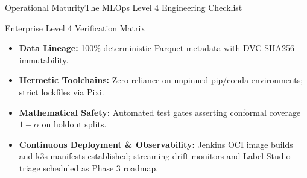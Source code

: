 \begin{frame}{Operational Maturity}{The MLOps Level 4 Engineering Checklist}
    \begin{block}{Enterprise Level 4 Verification Matrix}
        \begin{itemize}\small
            \item \textbf{Data Lineage:} 100\% deterministic Parquet metadata with DVC SHA256 immutability.
            \item \textbf{Hermetic Toolchains:} Zero reliance on unpinned pip/conda environments; strict lockfiles via Pixi.
            \item \textbf{Mathematical Safety:} Automated test gates asserting conformal coverage $1-\alpha$ on holdout splits.
            \item \textbf{Continuous Deployment \& Observability:} Jenkins OCI image builds and k3s manifests established; streaming drift monitors and Label Studio triage scheduled as Phase 3 roadmap.
        \end{itemize}
    \end{block}

    \vspace{0.25cm}
    \statuspartial

\end{frame}
